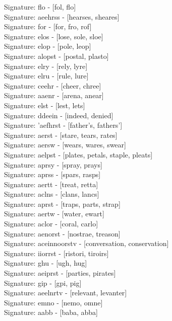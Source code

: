 Signature: {flo} - [fol, flo] \\
Signature: {aeehrss} - [hearses, sheares] \\
Signature: {for} - [for, fro, rof] \\
Signature: {elos} - [lose, sole, sloe] \\
Signature: {elop} - [pole, leop] \\
Signature: {alopst} - [postal, plasto] \\
Signature: {elry} - [rely, lyre] \\
Signature: {elru} - [rule, lure] \\
Signature: {ceehr} - [cheer, chree] \\
Signature: {aaenr} - [arena, anear] \\
Signature: {elst} - [lest, lets] \\
Signature: {ddeein} - [indeed, denied] \\
Signature: {'aefhrst} - [father's, fathers'] \\
Signature: {aerst} - [stare, tears, rates] \\
Signature: {aersw} - [wears, wares, swear] \\
Signature: {aelpst} - [plates, petals, staple, pleats] \\
Signature: {aprsy} - [spray, prays] \\
Signature: {aprss} - [spars, rasps] \\
Signature: {aertt} - [treat, retta] \\
Signature: {aclns} - [clans, lancs] \\
Signature: {aprst} - [traps, parts, strap] \\
Signature: {aertw} - [water, ewart] \\
Signature: {aclor} - [coral, carlo] \\
Signature: {aenorst} - [nostrae, treason] \\
Signature: {aceinnoorstv} - [conversation, conservation] \\
Signature: {iiorrst} - [ristori, tiroirs] \\
Signature: {ghu} - [ugh, hug] \\
Signature: {aeiprst} - [parties, pirates] \\
Signature: {gip} - [gpi, pig] \\
Signature: {aeelnrtv} - [relevant, levanter] \\
Signature: {emno} - [nemo, omne] \\
Signature: {aabb} - [baba, abba] \\
